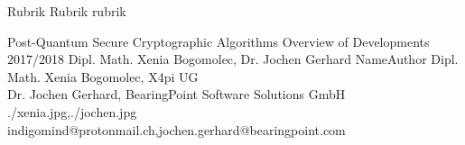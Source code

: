 \documentclass[a4paper,11pt,draft]{article}
\begin{document}
\setcounter{footnote}{0}
\setcounter{figure}{0}


\Abschnitt
{Rubrik}
{Rubrik}
{rubrik}

\vspace{3mm}


\Aufsatz
{Post-Quantum Secure Cryptographic Algorithms}
{Overview of Developments 2017/2018}
{Dipl. Math. Xenia Bogomolec, Dr. Jochen Gerhard}
{NameAuthor}
{Dipl. Math. Xenia Bogomolec, X4pi UG\\ Dr. Jochen Gerhard, BearingPoint Software Solutions GmbH}
{./xenia.jpg,./jochen.jpg}
{indigomind@protonmail.ch,jochen.gerhard@bearingpoint.com}
\end{document}
